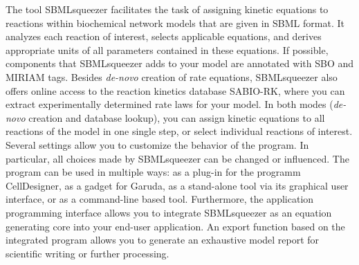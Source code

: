 The tool SBMLsqueezer facilitates the task of assigning kinetic equations to
reactions within biochemical network models that are given in \acs{SBML} format.
It analyzes each reaction of interest, selects applicable equations, and derives
appropriate units of all parameters contained in these equations.
If possible, components that SBMLsqueezer adds to your model are annotated with
\ac{SBO} and \ac{MIRIAM} tags.
Besides \emph{de-novo} creation of rate equations, SBMLsqueezer also offers
online access to the reaction kinetics database \ac{SABIO-RK}, where you can extract
experimentally determined rate laws for your model.
In both modes (\emph{de-novo} creation and database lookup), you can assign kinetic equations to all reactions of the model in
one single step, or select individual reactions of interest. 
Several settings allow you to customize the behavior of the program.
In particular, all choices made by SBMLsqueezer can be changed or influenced.
The program can be used in multiple ways: as a plug-in for the programm
CellDesigner, as a gadget for Garuda, as a stand-alone tool via its graphical
user interface, or as a command-line based tool.
Furthermore, the application programming interface allows you to integrate
SBMLsqueezer as an equation generating core into your end-user application.
An export function based on the integrated program \SBMLLaTeXs{} allows you to
generate an exhaustive model report for scientific writing or further
processing.
